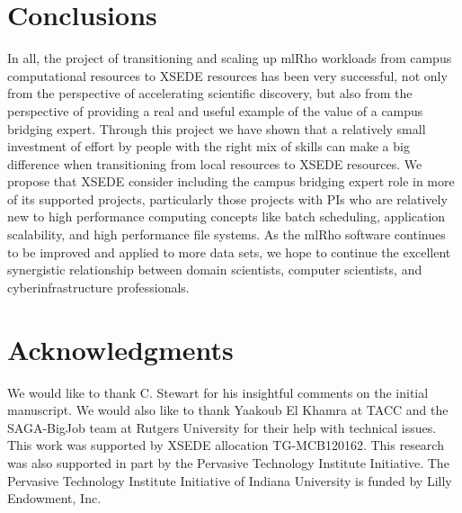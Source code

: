 \documentclass{sig-alternate}
\begin{document}
\section{Conclusions}\label{sec:conclusion}

In all, the project of transitioning and scaling up mlRho workloads from campus computational resources
to XSEDE resources has been very successful, not only from the perspective of accelerating scientific
discovery, but also from the perspective of providing a real and useful example of the value of a campus
bridging expert. Through this project we have shown that a relatively small investment of effort by people
with the right mix of skills can make a big difference when transitioning from local
resources to XSEDE resources. We propose that XSEDE consider including the campus bridging expert role in more
of its supported projects, particularly those projects with PIs who are relatively new to high performance
computing concepts like batch scheduling, application scalability, and high performance file systems. As the
mlRho software continues to be improved and applied to more data sets, we hope to continue the excellent
synergistic relationship between domain scientists, computer scientists, and cyberinfrastructure
professionals.


\section{Acknowledgments}
We would like to thank C. Stewart for his insightful comments on the initial manuscript. We would also like to thank Yaakoub El Khamra at TACC and the SAGA-BigJob team at Rutgers University for their help with technical issues. This work was
supported by XSEDE allocation TG-MCB120162. This research was also supported in part by the Pervasive
Technology Institute Initiative. The Pervasive Technology Institute Initiative of Indiana University is funded
by Lilly Endowment, Inc.
%

%
%
\end{document}
